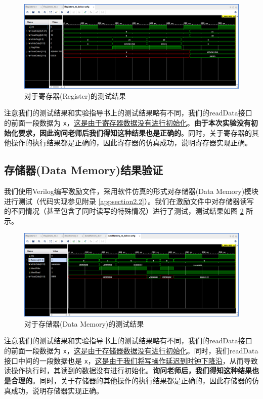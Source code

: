 \documentclass{cumcm}
\numberwithin{equation}{section}
\numberwithin{equation}{subsection}
\begin{document}
\begin{figure}[htbp]
    \centering
    \includegraphics[width=6.3in]{1.png}
    \caption{对于寄存器(Register)的测试结果}
    \label{fig3}
\end{figure}

注意我们的测试结果和实验指导书上的测试结果略有不同，我们的readData接口的前面一段数据为 \texttt{x}，\underline{这是由于寄存器数据没有进行初始化}。\textbf{由于本次实验没有初始化要求，因此询问老师后我们得知这种结果也是正确的}。同时，关于寄存器的其他操作的执行结果都是正确的，因此寄存器的仿真成功，说明寄存器实现正确。

\subsection{存储器(Data Memory)结果验证}\label{section4.2}

我们使用Verilog编写激励文件，采用软件仿真的形式对存储器(Data Memory)模块进行测试（代码实现参见附录 \ref{appsection2.2}）。我们在激励文件中对存储器读写的不同情况（甚至包含了同时读写的特殊情况）进行了测试，测试结果如图 \ref{fig4} 所示。

\begin{figure}[htbp]
    \centering
    \includegraphics[width=6.3in]{2.png}
    \caption{对于存储器(Data Memory)的测试结果}
    \label{fig4}
\end{figure}

注意我们的测试结果和实验指导书上的测试结果略有不同，我们的readData接口的前面一段数据为 \texttt{x}，\underline{这是由于存储器数据没有进行初始化}。同时，我们readData接口中间的一段数据也是 \texttt{x}，\underline{这是由于我们将写操作延迟到时钟下降沿}，从而导致读操作执行时，其读到的数据没有进行初始化。\textbf{询问老师后，我们得知这种结果也是合理的}。同时，关于存储器的其他操作的执行结果都是正确的，因此存储器的仿真成功，说明存储器实现正确。
\end{document}
